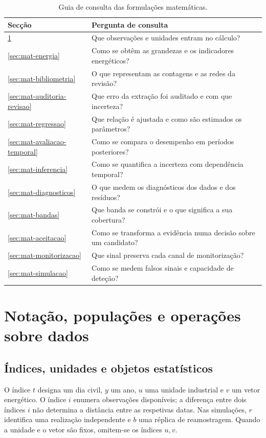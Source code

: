 \begin{table}[htbp]
\centering\small
\caption{Guia de consulta das formulações matemáticas.}
\label{tab:mat-acesso}
\begin{tabularx}{\linewidth}{@{}lX@{}}\toprule
Secção & Pergunta de consulta\\\midrule
\ref{sec:mat-notacao-dados} & Que observações e unidades entram no cálculo?\\
\ref{sec:mat-energia} & Como se obtêm as grandezas e os indicadores energéticos?\\
\ref{sec:mat-bibliometria} & O que representam as contagens e as redes da revisão?\\
\ref{sec:mat-auditoria-revisao} & Que erro da extração foi auditado e com que incerteza?\\
\ref{sec:mat-regressao} & Que relação é ajustada e como são estimados os parâmetros?\\
\ref{sec:mat-avaliacao-temporal} & Como se compara o desempenho em períodos posteriores?\\
\ref{sec:mat-inferencia} & Como se quantifica a incerteza com dependência temporal?\\
\ref{sec:mat-diagnosticos} & O que medem os diagnósticos dos dados e dos resíduos?\\
\ref{sec:mat-bandas} & Que banda se constrói e o que significa a sua cobertura?\\
\ref{sec:mat-aceitacao} & Como se transforma a evidência numa decisão sobre um candidato?\\
\ref{sec:mat-monitorizacao} & Que sinal preserva cada canal de monitorização?\\
\ref{sec:mat-simulacao} & Como se medem falsos sinais e capacidade de deteção?\\\bottomrule
\end{tabularx}
\end{table}

\section{Notação, populações e operações sobre dados}
\label{sec:mat-notacao-dados}

\subsection{Índices, unidades e objetos estatísticos}
\label{sec:mat-notacao}
O índice $t$ designa um dia civil, $y$ um ano, $u$ uma unidade industrial e $v$ um vetor energético. O índice $i$ enumera observações disponíveis; a diferença entre dois índices $i$ não determina a distância entre as respetivas datas. Nas simulações, $r$ identifica uma realização independente e $b$ uma réplica de reamostragem. Quando a unidade e o vetor são fixos, omitem-se os índices $u,v$.

